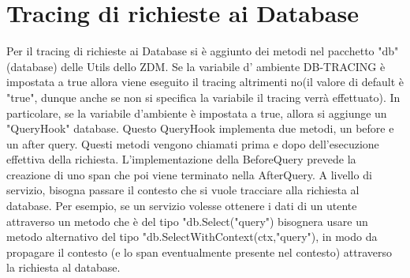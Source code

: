 \documentclass[a4paper,12pt,titlepage,italian,openany]{report}
\begin{document}
\section{Tracing di richieste ai Database}
Per il tracing di richieste ai Database si è aggiunto dei metodi nel pacchetto "db" (database) delle Utils dello ZDM\cite{zdm:1}. Se la variabile 
d' ambiente DB-TRACING è impostata a true allora viene eseguito il tracing altrimenti no(il valore di default è "true", dunque anche se 
non si specifica la variabile il tracing verrà effettuato).
In particolare, se la variabile d'ambiente è impostata a true, allora si aggiunge un "QueryHook" database. Questo QueryHook
 implementa due metodi, un before e  un after query. Questi metodi vengono chiamati prima e dopo dell'esecuzione effettiva della richiesta. L'implementazione della BeforeQuery prevede la creazione di uno span che poi viene terminato nella AfterQuery.
A livello di servizio, bisogna passare il contesto che si vuole tracciare alla richiesta al database. Per esempio, se un servizio volesse ottenere i dati di un utente attraverso un metodo che è del tipo "db.Select("query") bisognera usare un metodo alternativo del tipo "db.SelectWithContext(ctx,"query"), in modo da propagare il contesto (e lo span eventualmente presente nel contesto) attraverso la richiesta al database.


\newpage
\end{document}
